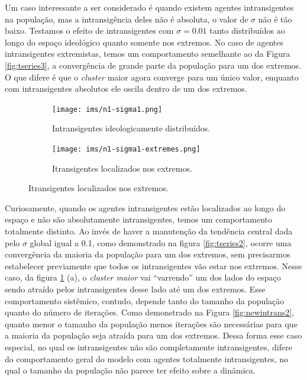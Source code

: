   Um caso interessante a ser considerado é quando existem agentes intransigentes
  na população, mas a intransigência deles não é absoluta, o valor de \(\sigma\)
  não é tão baixo. Testamos o efeito de intransigentes com \(\sigma = 0.01\)
  tanto distribuídos ao longo do espaço ideológico quanto somente nos extremos.
  No caso de agentes intransigentes extremistas, temos um comportamento
  semelhante ao da Figura \ref{fig:tseries3}, a convergência de grande parte da
  população para um dos extremos. O que difere é que o \textit{cluster} maior
  agora converge para um único valor, enquanto com intransigentes absolutos ele
  oscila dentro de um dos extremos.

    \begin{figure}[H]
    \centering
     \caption{ Intransigentes com \(\sigma = 0.01\). Parametrização global: \( \sigma =
       0.1, \text{ } p\_intran = 0.15, \text{ } N = 500, \text{ } p = 0.9,
       \text{ } \rho = 1e-5, \text{ } n\_issues = 1 \)}
    \begin{subfigure}[b]{0.49\textwidth}
      \texttt{[image: ims/n1-sigma1.png]}
      \caption{Intransigentes ideologicamente distribuídos.}
    \end{subfigure}
    \begin{subfigure}[b]{0.49\textwidth}
      \texttt{[image: ims/n1-sigma1-extremes.png]}
       \caption{Itransigentes localizados nos extremos.}
     \end{subfigure}

    \label{fig:newintrans}
     \end{figure}
  
     Curiosamente, quando os agentes intransigentes estão localizados ao longo
     do espaço e não são absolutamente intransigentes, temos um comportamento
     totalmente distinto. Ao invés de haver a manutenção da tendência central
     dada pelo \(\sigma\) global igual a 0.1, como demonstrado na figura
     \ref{fig:tseries2}, ocorre uma convergência da maioria da população para um
     dos extremos, sem precisarmos estabelecer previamente que todos os
     intransigentes vão estar nos extremos. Nesse caso, da figura
     \ref{fig:newintrans} (a), o \textit{cluster maior} vai ``varrendo'' um dos
     lados do espaço sendo atraído pelos intransigentes desse lado até um dos
     extremos. Esse comportamento sistêmico, contudo, depende tanto do tamanho
     da população quanto do número de iterações. Como demonstrado na Figura
     \ref{fig:newintrans2}, quanto menor o tamanho da população menos iterações
     são necessárias para que a maioria da população seja atraída para um dos
     extremos. Dessa forma esse caso especial, no qual os intransigentes não são
     completamente intransigentes, difere do comportamento geral do modelo com
     agentes totalmente intransigentes, no qual o tamanho da população não
     parece ter efeito sobre a dinâmica.
     
